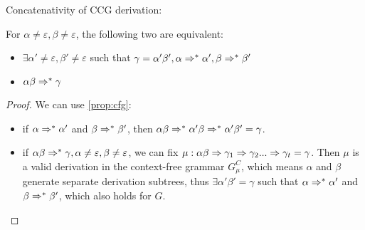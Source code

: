 \documentclass[main.tex]{subfiles}
\begin{document}
\begin{prop}\label{prop:concat}
    Concatenativity of CCG derivation:

    For $\alpha \neq \varepsilon, \beta \neq \varepsilon$, the following two are equivalent:
    \begin{itemize}

        \item $\exists \alpha' \neq \varepsilon, \beta' \neq \varepsilon$
            such that $\gamma = \alpha' \beta', \alpha \Rightarrow^* \alpha', \beta \Rightarrow^* \beta'$
        \item $\alpha \beta \Rightarrow^* \gamma$
    \end{itemize}
\end{prop}
\begin{proof}
    We can use \cref{prop:cfg}:

    \begin{itemize}
        \item if $\alpha \Rightarrow^* \alpha'$ and $\beta \Rightarrow^* \beta'$,
            then $\alpha \beta \Rightarrow^* \alpha' \beta \Rightarrow^* \alpha' \beta' = \gamma$.
        \item if $\alpha \beta \Rightarrow^* \gamma, \alpha \neq \varepsilon, \beta \neq \varepsilon$,
            we can fix $\mu: \alpha \beta \Rightarrow \gamma_1 \Rightarrow \gamma_2 ... \Rightarrow \gamma_t = \gamma$.
            Then $\mu$ is a valid derivation in the context-free grammar $G^C_{\mu}$,
            which means $\alpha$ and $\beta$ generate separate derivation
            subtrees, thus $\exists \alpha' \beta' = \gamma$ such that
            $\alpha \Rightarrow^* \alpha'$ and $\beta \Rightarrow^* \beta'$,
            which also holds for $G$.
    \end{itemize}
\end{proof}
\end{document}
